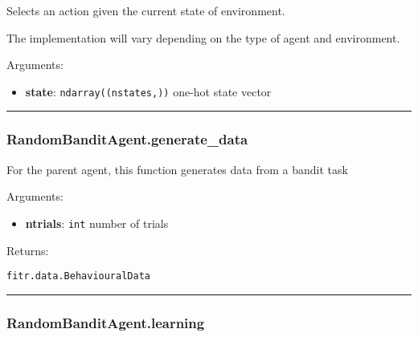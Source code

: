 Selects an action given the current state of environment.

The implementation will vary depending on the type of agent and
environment.

Arguments:

\begin{itemize}
\tightlist
\item
  \textbf{state}: \texttt{ndarray((nstates,))} one-hot state vector
\end{itemize}

\begin{center}\rule{0.5\linewidth}{\linethickness}\end{center}

\subsubsection{RandomBanditAgent.generate\_data}\label{randombanditagent.generate_data}

\begin{Shaded}
\begin{Highlighting}[]
\end{Highlighting}
\end{Shaded}

For the parent agent, this function generates data from a bandit task

Arguments:

\begin{itemize}
\tightlist
\item
  \textbf{ntrials}: \texttt{int} number of trials
\end{itemize}

Returns:

\texttt{fitr.data.BehaviouralData}

\begin{center}\rule{0.5\linewidth}{\linethickness}\end{center}

\subsubsection{RandomBanditAgent.learning}\label{randombanditagent.learning}

\begin{Shaded}
\begin{Highlighting}[]
\end{Highlighting}
\end{Shaded}

